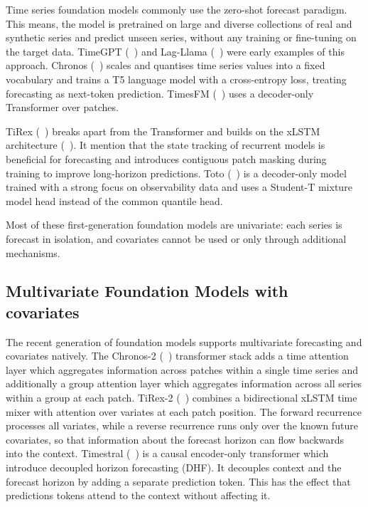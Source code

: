 Time series foundation models commonly use the zero-shot forecast paradigm. This means, the model is pretrained on large and diverse collections of real and synthetic series and predict unseen series, without any training or fine-tuning on the target data. TimeGPT (\citeauthor{timegpt}~\cite{timegpt}) and Lag-Llama (\citeauthor{lagllama}~\cite{lagllama}) were early examples of this approach. Chronos (\citeauthor{chronos}~\cite{chronos}) scales and quantises time series values into a fixed vocabulary and trains a T5 language model with a cross-entropy loss, treating forecasting as next-token prediction. TimesFM (\citeauthor{timesfm}~\cite{timesfm}) uses a decoder-only Transformer over patches.

TiRex (\citeauthor{tirex1}~\cite{tirex1}) breaks apart from the Transformer and builds on the xLSTM architecture (\citeauthor{xlstm}~\cite{xlstm}). It mention that the state tracking of recurrent models is beneficial for forecasting and introduces contiguous patch masking during training to improve long-horizon predictions. Toto (\citeauthor{toto1}~\cite{toto1}) is a decoder-only model trained with a strong focus on observability data and uses a Student-T mixture model head instead of the common quantile head. 

Most of these first-generation foundation models are univariate: each series is forecast in isolation, and covariates cannot be used or only through additional mechanisms. 


\subsection{Multivariate Foundation Models with covariates}
\label{sec:rw_multivariate}

The recent generation of foundation models supports multivariate forecasting and covariates natively. The Chronos-2 (\citeauthor{chronos2}~\cite{chronos2}) transformer stack adds a time attention layer which aggregates information across patches within a single time series and additionally a group attention layer which aggregates information across all series within a group at each patch.
TiRex-2 (\citeauthor{tirex2}~\cite{tirex2}) combines a bidirectional xLSTM time mixer with attention over variates at each patch position. The forward recurrence processes all variates, while a reverse recurrence runs only over the known future covariates, so that information about the forecast horizon can flow backwards into the context. Timestral (\citeauthor{timestral}~\cite{timestral}) is a causal encoder-only transformer which introduce decoupled horizon forecasting (DHF). It decouples context and the forecast horizon by adding a separate prediction token. This has the effect that predictions tokens attend to the context without affecting it.

